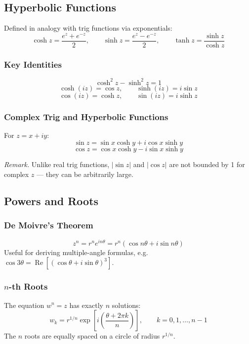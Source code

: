 \documentclass[11pt, letterpaper]{article}
\theoremstyle{plain}
\newenvironment{remark}{\smallskip\noindent\textit{Remark.}}{\smallskip}
\renewcommand{\Re}{\operatorname{Re}}
\begin{document}
\subsection{Hyperbolic Functions}

Defined in analogy with trig functions via exponentials:
\[
    \cosh z = \frac{e^z + e^{-z}}{2}, \qquad
    \sinh z = \frac{e^z - e^{-z}}{2}, \qquad
    \tanh z = \frac{\sinh z}{\cosh z}
\]

\subsubsection*{Key Identities}
\[
    \cosh^2 z - \sinh^2 z = 1
\]
\[
    \cosh(iz) = \cos z, \qquad \sinh(iz) = i\sin z
\]
\[
    \cos(iz) = \cosh z, \qquad \sin(iz) = i\sinh z
\]

\subsubsection*{Complex Trig and Hyperbolic Functions}
For $z = x + iy$:
\[
    \sin z = \sin x\cosh y + i\cos x\sinh y
\]
\[
    \cos z = \cos x\cosh y - i\sin x\sinh y
\]

\begin{remark}
    Unlike real trig functions, $|\sin z|$ and $|\cos z|$ are not bounded
    by 1 for complex $z$ — they can be arbitrarily large.
\end{remark}


\subsection{Powers and Roots}

\subsubsection*{De Moivre's Theorem}
\[
    z^n = r^n e^{in\theta} = r^n(\cos n\theta + i\sin n\theta)
\]
Useful for deriving multiple-angle formulas, e.g.\
$\cos 3\theta = \Re[(\cos\theta + i\sin\theta)^3]$.

\subsubsection*{$n$-th Roots}
The equation $w^n = z$ has exactly $n$ solutions:
\[
    w_k = r^{1/n}\exp\!\left[i\left(\frac{\theta + 2\pi k}{n}\right)\right],
    \qquad k = 0, 1, \ldots, n-1
\]
The $n$ roots are equally spaced on a circle of radius $r^{1/n}$.
\end{document}
